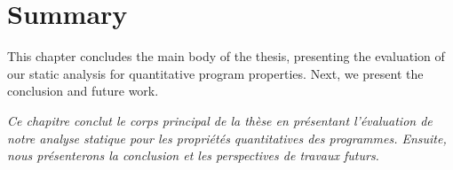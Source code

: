 \section{Summary}

This chapter concludes the main body of the thesis, presenting the evaluation of our static analysis for quantitative program properties.
Next, we present the conclusion and future work.


\frenchdiv

\emph{Ce chapitre conclut le corps principal de la thèse en présentant l'évaluation de notre analyse statique pour les propriétés quantitatives des programmes. Ensuite, nous présenterons la conclusion et les perspectives de travaux futurs.}
